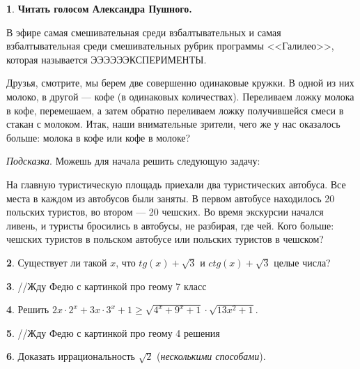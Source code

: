 \documentclass[14pt, a4paper]{extarticle}
\theoremstyle{definition}
\newtheorem{problem}{}
\theoremstyle{definition}
\theoremstyle{remark}
\numberwithin{equation}{section}
\begin{document}
\begin{problem}
    \textbf{Читать голосом Александра Пушного.}

    В эфире самая смешивательная среди взбалтывательных и самая
    взбалтывательная среди смешивательных рубрик программы <<Галилео>>, 
    которая называется ЭЭЭЭЭЭКСПЕРИМЕНТЫ.
    
    Друзья, смотрите, мы берем две совершенно одинаковые кружки.
    В одной из них молоко, в другой --- кофе (в одинаковых количествах). 
    Переливаем ложку молока в кофе, перемешаем, 
    а затем обратно переливаем ложку получившейся смеси в стакан с молоком. 
    Итак, наши внимательные зрители, чего же у нас оказалось больше:
    молока в кофе или кофе в молоке?

    \textit{Подсказка}. Можешь для начала решить следующую задачу:

    На главную туристическую площадь приехали два туристических 
    автобуса. Все места в каждом из автобусов были заняты. 
    В первом автобусе находилось 20 польских 
    туристов, во втором --- 20 чешских. Во время экскурсии 
    начался ливень, и туристы бросились в автобусы, не разбирая, где чей. 
    Кого больше: чешских туристов в польском автобусе или польских 
    туристов в чешском?
\end{problem}

\begin{problem}
    Существует ли такой $x$, что $tg(x) + \sqrt{3}$ и 
    $ctg(x) + \sqrt{3}$ целые числа?
\end{problem}

\begin{problem}
    //Жду Федю с картинкой про геому 7 класс
\end{problem}

\begin{problem}
    Решить $2x \cdot 2^x + 3x \cdot 3^x + 1 \geqslant 
    \sqrt{4^x + 9^x +1} \cdot \sqrt{13x^2 + 1}.$
\end{problem}

\begin{problem}
    //Жду Федю с картинкой про геому 4 решения
\end{problem}

\begin{problem}
    Доказать иррациональность $\sqrt{2}$ (\textit{несколькими способами}).
\end{problem}
\end{document}
